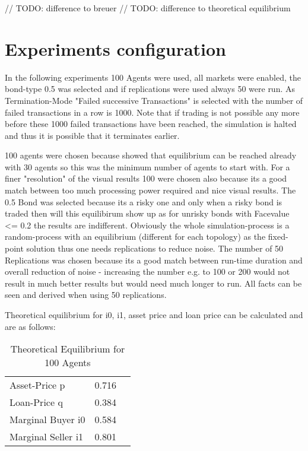 \documentclass[Bachelorarbeit.tex]{subfiles}
\begin{document}
// TODO: difference to breuer 
// TODO: difference to theoretical equilibrium

\section{Experiments configuration}
In the following experiments 100 Agents were used, all markets were enabled, the bond-type 0.5 was selected and if replications were used always 50 were run.
As Termination-Mode "Failed successive Transactions" is selected with the number of failed transactions in a row is 1000. Note that if trading is not possible any more before these 1000 failed transactions have been reached, the simulation is halted and thus it is possible that it terminates earlier.

100 agents were chosen because \cite{Breuer2015} showed that equilibrium can be reached already with 30 agents so this was the minimum number of agents to start with. For a finer "resolution" of the visual results 100 were chosen also because its a good match between too much processing power required and nice visual results.
The 0.5 Bond was selected because its a risky one and only when a risky bond is traded then will this equilibirum show up as for unrisky bonds with Facevalue <= 0.2 the results are indifferent.
Obviously the whole simulation-process is a random-process with an equilibrium (different for each topology) as the fixed-point solution thus one needs replications to reduce noise. The number of 50 Replications was chosen because its a good match between run-time duration and overall reduction of noise - increasing the number e.g. to 100 or 200 would not result in much better results but would need much longer to run. All facts can be seen and derived when using 50 replications.

Theoretical equilibrium for i0, i1, asset price and loan price can be calculated and are as follows:

\begin{table}[h]
	\centering
	\caption{Theoretical Equilibrium for 100 Agents}
	\begin{tabular} { l c r }
		\hline
		Asset-Price p & 0.716 \\
		Loan-Price q & 0.384 \\
		Marginal Buyer i0 & 0.584 \\
		Marginal Seller i1 & 0.801 \\
		\hline
	\end{tabular}
\end{table}
\end{document}
